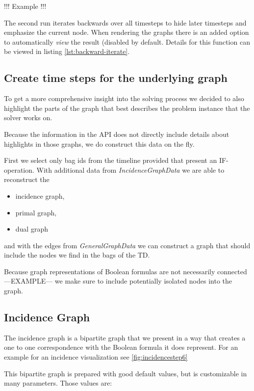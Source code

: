\documentclass[a4paper, 12pt]{scrartcl}
\begin{document}
!!! Example !!!

The second run iterates backwards over all timesteps to hide later timesteps and emphasize the current node.
When rendering the graphs there is an added option to automatically \textit{view} the result (disabled by default. Details for this function can be viewed in listing \ref{lst:backward-iterate}.

\subsection{Create time steps for the underlying graph}
To get a more comprehensive insight into the solving process we decided to also highlight the parts of the 
graph that best describes the problem instance that the solver works on.

Because the information in the API does not directly include details about highlights in those graphs, we do construct this data on the fly.

First we select only bag ids from the timeline provided that present an IF-operation.
With additional data from \textit{IncidenceGraphData} we are able to reconstruct the
\begin{itemize}
	\item incidence graph,
	\item primal graph,
	\item dual graph
\end{itemize}
and with the edges from \textit{GeneralGraphData} we can construct a graph that should include the nodes we find in the bags of the TD.

Because graph representations of Boolean formulas are not necessarily connected ---EXAMPLE--- we make sure to include potentially isolated nodes into the graph.

\subsection{Incidence Graph}
The incidence graph is a bipartite graph that we present in a way that creates a one to one correspondence with the 
Boolean formula it does represent. For an example for an incidence visualization see \ref{fig:incidencestep6}

This bipartite graph is prepared with good default values, but is customizable in many parameters.
Those values are:
\end{document}
